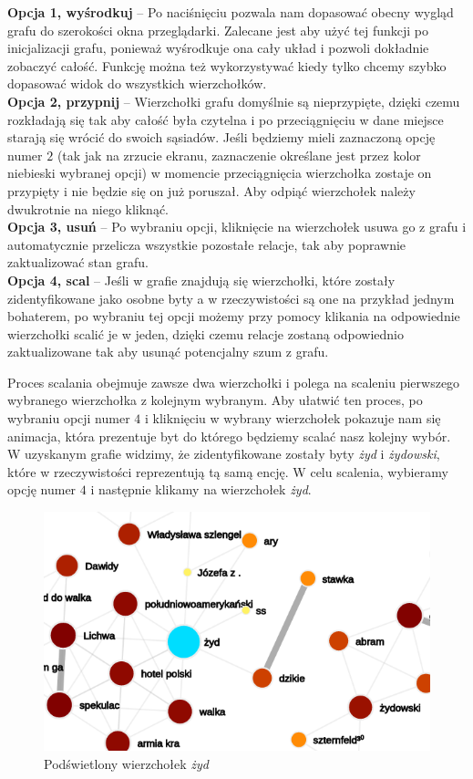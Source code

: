 \documentclass[12pt, a4paper]{article}
\begin{document}
\noindent \textbf{Opcja 1, wyśrodkuj} -- Po naciśnięciu pozwala nam dopasować obecny wygląd grafu do szerokości okna przeglądarki. Zalecane jest aby użyć tej funkcji po inicjalizacji grafu, ponieważ wyśrodkuje ona cały układ i pozwoli dokładnie zobaczyć całość. Funkcję można też wykorzystywać kiedy tylko chcemy szybko dopasować widok do wszystkich wierzchołków.\\

\noindent \textbf{Opcja 2, przypnij} -- Wierzchołki grafu domyślnie są nieprzypięte, dzięki czemu rozkładają się tak aby całość była czytelna i po przeciągnięciu w dane miejsce starają się wrócić do swoich sąsiadów. Jeśli będziemy mieli zaznaczoną opcję numer $2$ (tak jak na zrzucie ekranu, zaznaczenie określane jest przez kolor niebieski wybranej opcji) w momencie przeciągnięcia wierzchołka zostaje on przypięty i nie będzie się on już poruszał. Aby odpiąć wierzchołek należy dwukrotnie na niego kliknąć.\\

\noindent \textbf{Opcja 3, usuń} -- Po wybraniu opcji, kliknięcie na wierzchołek usuwa go z grafu i automatycznie przelicza wszystkie pozostałe relacje, tak aby poprawnie zaktualizować stan grafu.\\

\noindent \textbf{Opcja 4, scal} -- Jeśli w grafie znajdują się wierzchołki, które zostały zidentyfikowane jako osobne byty a w rzeczywistości są one na przykład jednym bohaterem, po wybraniu tej opcji możemy przy pomocy klikania na odpowiednie wierzchołki scalić je w jeden, dzięki czemu relacje zostaną odpowiednio zaktualizowane tak aby usunąć potencjalny szum z grafu.

Proces scalania obejmuje zawsze dwa wierzchołki i polega na scaleniu pierwszego wybranego wierzchołka z kolejnym wybranym. Aby ułatwić ten proces, po wybraniu opcji numer $4$ i kliknięciu w wybrany wierzchołek pokazuje nam się animacja, która prezentuje byt do którego będziemy scalać nasz kolejny wybór. W uzyskanym grafie widzimy, że zidentyfikowane zostały byty \textit{żyd} i \textit{żydowski}, które w rzeczywistości reprezentują tą samą encję. W celu scalenia, wybieramy opcję numer $4$ i następnie klikamy na wierzchołek \textit{żyd}.

\begin{figure}[H]
    \centering
    \includegraphics[width=\linewidth]{images/graph-jew-highlight.png}
    \caption{Podświetlony wierzchołek \textit{żyd}}
\end{figure}
\end{document}
